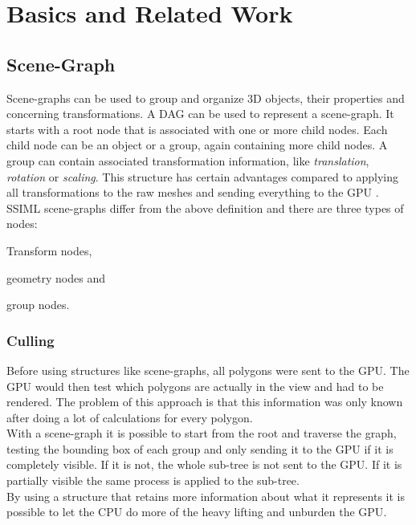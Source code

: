 
\section{Basics and Related Work}
\label{basics-and-related-work}

\subsection{Scene-Graph}\label{scene-graph}

Scene-graphs can be used to group and organize \gls{3D} objects, their properties and
concerning transformations. A \gls{DAG} can be used to represent a scene-graph.
It starts with a root node that is associated with one or more child nodes. Each
child node can be an object or a group, again containing more child nodes. A group can
contain associated transformation information, like \emph{translation},
\emph{rotation} or \emph{scaling}. This structure has certain advantages
compared to applying all transformations to the raw meshes and sending
everything to the \gls{GPU} \cite{realityprime}. \gls{SSIML} scene-graphs differ from the
above definition and there are three types of nodes:

\begin{itemize*}
  \item Transform nodes,
  \item geometry nodes and
  \item group nodes.
\end{itemize*}

\subsubsection{Culling}\label{culling}

Before using structures like scene-graphs, all polygons were sent to
the \gls{GPU}. The \gls{GPU} would then test which polygons are actually in the
view and had to be rendered. The problem of this approach is
that this information was only known after doing a lot of calculations
for every polygon.\\
With a scene-graph it is possible to start from the root and traverse the
graph, testing the bounding box of each group and only sending it to the
\gls{GPU} if it is completely visible. If it is not, the whole sub-tree is not
sent to the \gls{GPU}. If it is partially visible the same process is applied
to the sub-tree.\\
By using a structure that retains more information about what it
represents it is possible to let the CPU do more of the heavy
lifting and unburden the \gls{GPU}.

